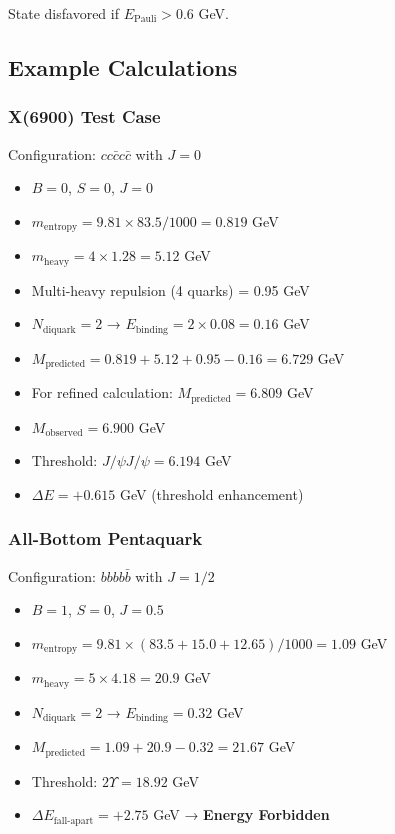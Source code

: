 \documentclass[12pt,a4paper]{article}
\begin{document}
State disfavored if $E_{\text{Pauli}} > 0.6$ GeV.

\subsection{Example Calculations}

\subsubsection{X(6900) Test Case}

Configuration: $cc\bar{c}c\bar{c}$ with $J=0$

\begin{itemize}
\item $B = 0$, $S = 0$, $J = 0$
\item $m_{\text{entropy}} = 9.81 \times 83.5/1000 = 0.819$ GeV
\item $m_{\text{heavy}} = 4 \times 1.28 = 5.12$ GeV
\item Multi-heavy repulsion (4 quarks) = 0.95 GeV
\item $N_{\text{diquark}} = 2$ → $E_{\text{binding}} = 2 \times 0.08 = 0.16$ GeV
\item $M_{\text{predicted}} = 0.819 + 5.12 + 0.95 - 0.16 = 6.729$ GeV
\item For refined calculation: $M_{\text{predicted}} = 6.809$ GeV
\item $M_{\text{observed}} = 6.900$ GeV
\item Threshold: $J/\psi J/\psi = 6.194$ GeV
\item $\Delta E = +0.615$ GeV (threshold enhancement)
\end{itemize}

\subsubsection{All-Bottom Pentaquark}

Configuration: $bbbb\bar{b}$ with $J=1/2$

\begin{itemize}
\item $B = 1$, $S = 0$, $J = 0.5$
\item $m_{\text{entropy}} = 9.81 \times (83.5 + 15.0 + 12.65)/1000 = 1.09$ GeV
\item $m_{\text{heavy}} = 5 \times 4.18 = 20.9$ GeV
\item $N_{\text{diquark}} = 2$ → $E_{\text{binding}} = 0.32$ GeV
\item $M_{\text{predicted}} = 1.09 + 20.9 - 0.32 = 21.67$ GeV
\item Threshold: $2\Upsilon = 18.92$ GeV
\item $\Delta E_{\text{fall-apart}} = +2.75$ GeV → \textbf{Energy Forbidden}
\end{itemize}
\end{document}

